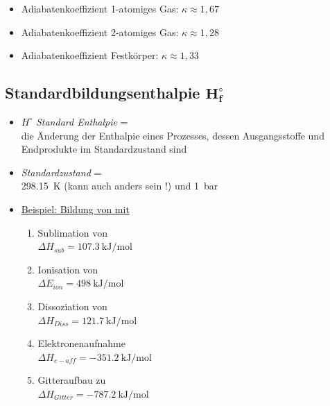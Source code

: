 \begin{itemize}
	\item Adiabatenkoeffizient 1-atomiges Gas: $\kappa \approx 1,67$
	\item Adiabatenkoeffizient 2-atomiges Gas: $\kappa \approx 1,28$
	\item Adiabatenkoeffizient Festkörper: $\kappa \approx 1,33$
\end{itemize}

\newpage

\subsection{Standardbildungsenthalpie $\boldsymbol{H^\circ_f}$}
\begin{itemize}
	\item $H^\circ$ \textit{Standard Enthalpie} = \\
	die Änderung der Enthalpie eines Prozesses, dessen Ausgangsstoffe und Endprodukte im Standardzustand sind
	\item \textit{Standardzustand} =\\
	\SI{298,15}{\kelvin} (kann auch anders sein !) und \SI{1}{\bar}
	\item \underline{Beispiel: Bildung von  mit  }\\
	\begin{enumerate}
		\item Sublimation von  \\
		 \hspace*{25mm} $\Delta H_{sub} 	= \SI{107.3}{\kilo \joule \per \mol}$
		\item Ionisation von  \\
		 \hspace*{10mm} $\Delta E_{ion} 	= \SI{498}{\kilo \joule \per \mol}$
		\item Dissoziation von  \\
		 \hspace*{25mm} $\Delta H_{Diss} 	= \SI{121.7}{\kilo \joule \per \mol}$
		\item Elektronenaufnahme  \\
		 \hspace*{20mm} $\Delta H_{e-aff} 	= \SI{-351.2}{\kilo \joule \per \mol}$
		\item Gitteraufbau zu  \\
		 \hspace*{7mm} $\Delta H_{Gitter} 	= \SI{-787.2}{\kilo \joule \per \mol}$
	\end{enumerate}
	

\end{itemize}
